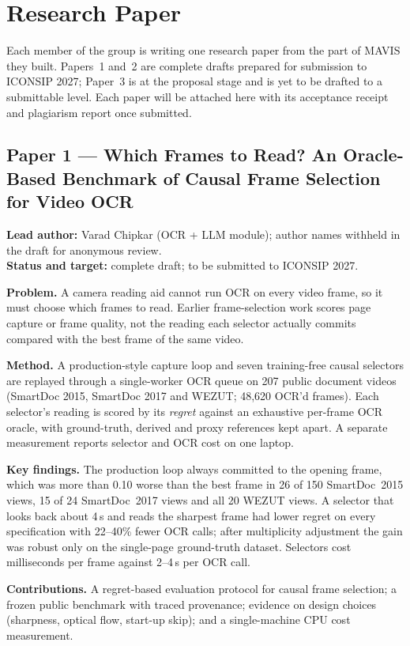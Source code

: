 \documentclass[12pt,singleside,a4paper]{article}
\begin{document}
\section{Research Paper}
Each member of the group is writing one research paper from the part of MAVIS they built. Papers~1 and~2 are complete drafts prepared for submission to ICONSIP 2027; Paper~3 is at the proposal stage and is yet to be drafted to a submittable level. Each paper will be attached here with its acceptance receipt and plagiarism report once submitted.

\subsection{Paper 1 --- Which Frames to Read? An Oracle-Based Benchmark of Causal Frame Selection for Video OCR}
\textbf{Lead author:} Varad Chipkar (OCR + LLM module); author names withheld in the draft for anonymous review.\\
\textbf{Status and target:} complete draft; to be submitted to ICONSIP 2027.

\textbf{Problem.} A camera reading aid cannot run OCR on every video frame, so it must choose which frames to read. Earlier frame-selection work scores page capture or frame quality, not the reading each selector actually commits compared with the best frame of the same video.

\textbf{Method.} A production-style capture loop and seven training-free causal selectors are replayed through a single-worker OCR queue on 207 public document videos (SmartDoc 2015, SmartDoc 2017 and WEZUT; 48,620 OCR'd frames). Each selector's reading is scored by its \emph{regret} against an exhaustive per-frame OCR oracle, with ground-truth, derived and proxy references kept apart. A separate measurement reports selector and OCR cost on one laptop.

\textbf{Key findings.} The production loop always committed to the opening frame, which was more than 0.10 worse than the best frame in 26 of 150 SmartDoc~2015 views, 15 of 24 SmartDoc~2017 views and all 20 WEZUT views. A selector that looks back about 4\,s and reads the sharpest frame had lower regret on every specification with 22--40\% fewer OCR calls; after multiplicity adjustment the gain was robust only on the single-page ground-truth dataset. Selectors cost milliseconds per frame against 2--4\,s per OCR call.

\textbf{Contributions.} A regret-based evaluation protocol for causal frame selection; a frozen public benchmark with traced provenance; evidence on design choices (sharpness, optical flow, start-up skip); and a single-machine CPU cost measurement.
\end{document}

